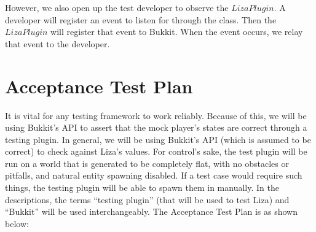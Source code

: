 \documentclass{article}
\begin{document}
	However, we also open up the test developer to observe
	the $LizaPlugin$. A developer will register an event to listen for through
	the class. Then the $LizaPlugin$ will register that event to Bukkit. When
	the event occurs, we relay that event to the developer.

\newpage
\section{Acceptance Test Plan}

\noindent It is vital for any testing framework to work reliably. Because of this, we will be using Bukkit's  
API to assert that the mock player's states are correct through a testing plugin. In general, we will be using
Bukkit's API (which is assumed to be correct) to check against Liza's values. For control’s sake, the test plugin
will be run on a world that is generated to be completely flat, with no obstacles or pitfalls, and natural entity 
spawning disabled. If a test case would require such things, the testing plugin will be able to spawn them in manually.
\newline \newline \noindent
In the descriptions, the terms “testing plugin” (that will be used to test Liza) and “Bukkit” will be used interchangeably.
\newline \newline \noindent
The Acceptance Test Plan is as shown below:



\end{document}
